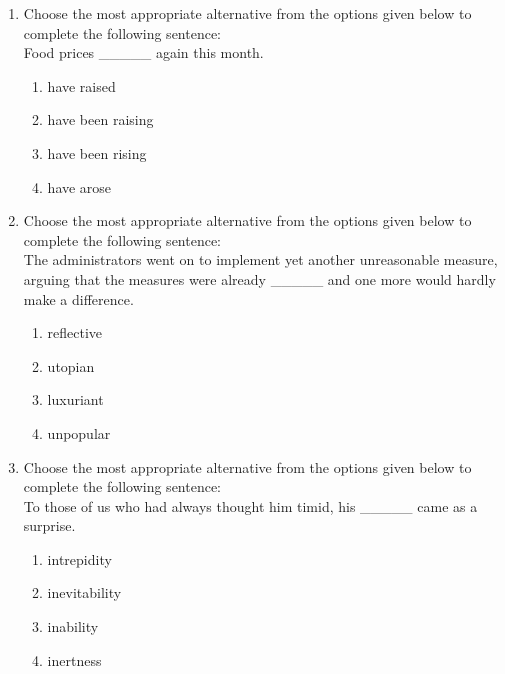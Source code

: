 \documentclass[journal]{IEEEtran}
\begin{document}
\begin{enumerate}[leftmargin=0pt]
\item Choose the most appropriate alternative from the options given below to complete the following sentence: \\
Food prices \_\_\_\_\_ again this month.
\begin{multicols}{2}
\begin{enumerate}[label=(\Alph*), itemsep=0pt, topsep=2pt]
  \item have raised
  \item have been raising
  \item have been rising
  \item have arose
\end{enumerate}
\end{multicols}
\hfill{}

\item Choose the most appropriate alternative from the options given below to complete the following sentence: \\
The administrators went on to implement yet another unreasonable measure, arguing that the measures were already \_\_\_\_\_ and one more would hardly make a difference.
\begin{multicols}{2}
\begin{enumerate}[label=(\Alph*), itemsep=0pt, topsep=2pt]
  \item reflective
  \item utopian
  \item luxuriant
  \item unpopular
\end{enumerate}
\end{multicols}
\hfill{}

\item Choose the most appropriate alternative from the options given below to complete the following sentence: \\
To those of us who had always thought him timid, his \_\_\_\_\_ came as a surprise.
\begin{multicols}{2}
\begin{enumerate}[label=(\Alph*), itemsep=0pt, topsep=2pt]
  \item intrepidity
  \item inevitability
  \item inability
  \item inertness
\end{enumerate}
\end{multicols}
\hfill{}


\end{enumerate}
\end{document}
